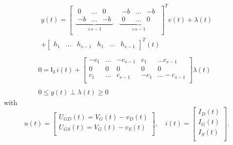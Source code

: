 \begin{equation}
  \label{eq:68}
  \begin{array}{l}
    \begin{split}
      y(t) = \left[\begin{array}{cc} \underbrace{ \begin{array}{ccc}
              0 & \ldots & 0 \\
              -b & \ldots & -b
            \end{array}}_{\times s-1}
          &\underbrace{ \begin{array}{ccc}-b &\ldots & -b \\ 0 &\ldots & 0\end{array}}_{\times s-1} \\
        \end{array}\right]^T
      v(t) + \lambda(t) \\ + \left[\begin{array}{cccccc} h_1 &\ldots &
          h_{s-1} & h_1 &\ldots & h_{s-1}
        \end{array}
      \right]^T (t)
    \end{split}
\\ \\ 
 0 =
  \mathsf I_3\,
 i(t) 
 + 
 \left[\begin{array}{cccccc}
   -c_1  &\ldots & -c_{s-1} & c_1 &\ldots c_{s-1} \\
   0  & 0& 0 &0  & 0  \\
   c_{1}  &\ldots & c_{s-1} & -c_1 &\ldots -c_{s-1} \\
 \end{array}\right]
\lambda(t) \\ \\ 0 \leq y(t) \perp \lambda(t) \geq 0
\end{array}
\end{equation}
  with
\begin{equation}
  \label{eq:69}
  u(t) = 
  \left[\begin{array}{c}
    U_{GD}(t)=V_G(t)-v_D(t) \\
    U_{GS}(t)=V_G(t)-v_S(t) \\ 
  \end{array}\right],\quad
i(t) = 
  \left[\begin{array}{c}
   I_D(t) \\
   I_G(t) \\
   I_S(t) \\
  \end{array}\right].
\end{equation}
